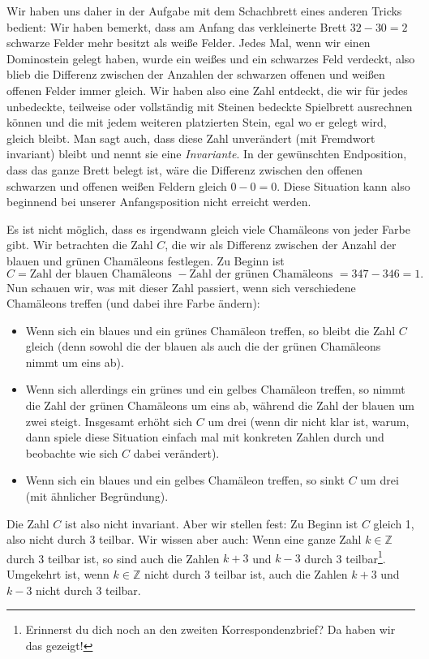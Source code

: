 \documentclass[a4paper,ngerman,12pt]{scrartcl}
\newcommand{\ZZ}{\mathbb{Z}}
\theoremstyle{definition}
\theoremstyle{plain}
\theoremstyle{remark}
\begin{document}
Wir haben uns daher in der Aufgabe mit dem Schachbrett eines anderen Tricks bedient: Wir haben bemerkt, dass am Anfang das verkleinerte Brett $32 - 30 = 2$ schwarze Felder mehr besitzt als weiße Felder. Jedes Mal, wenn wir einen Dominostein gelegt haben, wurde ein weißes und ein schwarzes Feld verdeckt, also blieb die Differenz zwischen der Anzahlen der schwarzen offenen und weißen offenen Felder immer gleich. Wir haben also eine Zahl entdeckt, die wir für jedes unbedeckte, teilweise oder vollständig mit Steinen bedeckte Spielbrett ausrechnen können und die mit jedem weiteren platzierten Stein, egal wo er gelegt wird, gleich bleibt. Man sagt auch, dass diese Zahl unverändert (mit Fremdwort invariant) bleibt und nennt sie eine \emph{Invariante}. In der gewünschten Endposition, dass das ganze Brett belegt ist, wäre die Differenz zwischen den offenen schwarzen und offenen weißen Feldern gleich $0 - 0 = 0$. Diese Situation kann also beginnend bei unserer Anfangsposition nicht erreicht werden.

Es ist nicht möglich, dass es irgendwann gleich viele Chamäleons von jeder Farbe gibt. Wir betrachten die Zahl $C$, die wir als Differenz zwischen der Anzahl der blauen und grünen Chamäleons festlegen. Zu Beginn ist
	\[C = \text{Zahl der blauen Chamäleons } - \text{Zahl der grünen Chamäleons } = 347 - 346 = 1.\]
Nun schauen wir, was mit dieser Zahl passiert, wenn sich verschiedene Chamäleons treffen (und dabei ihre Farbe ändern):
\begin{itemize}
	\item Wenn sich ein blaues und ein grünes Chamäleon treffen, so bleibt die Zahl $C$ gleich (denn sowohl die der blauen als auch die der grünen Chamäleons nimmt um eins ab).
	\item Wenn sich allerdings ein grünes und ein gelbes Chamäleon treffen, so nimmt die Zahl der grünen Chamäleons um eins ab, während die Zahl der blauen um zwei steigt. Insgesamt erhöht sich $C$ um drei (wenn dir nicht klar ist, warum, dann spiele diese Situation einfach mal mit konkreten Zahlen durch und beobachte wie sich $C$ dabei verändert).
	\item Wenn sich ein blaues und ein gelbes Chamäleon treffen, so sinkt $C$ um drei (mit ähnlicher Begründung).
\end{itemize}

Die Zahl $C$ ist also nicht invariant. Aber wir stellen fest: Zu Beginn ist $C$ gleich 1, also nicht durch 3 teilbar. Wir wissen aber auch: Wenn eine ganze Zahl $k \in \ZZ$ durch 3 teilbar ist, so sind auch die Zahlen $k + 3$ und $k - 3$ durch 3 teilbar\footnote{Erinnerst du dich noch an den zweiten Korrespondenzbrief? Da haben wir das gezeigt!}. Umgekehrt ist, wenn $k \in \ZZ$ nicht durch 3 teilbar ist, auch die Zahlen $k + 3$ und $k - 3$ nicht durch 3 teilbar. 
\end{document}
